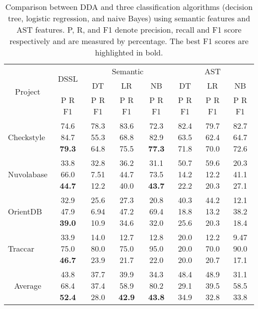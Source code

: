 \begin{table*}[t!]
	\centering
	\caption{Comparison between DDA and three classification algorithms (decision tree, logistic regression, and naive Bayes) using semantic features and AST features. P, R, and F1 denote precision, recall and F1 score respectively and are measured by percentage. The best F1 scores are highlighted in bold.}
	\begin{adjustbox}{width=1\textwidth}
	
	\begin{tabular}{|c|c|c|c|c|c|c|c|}
		\hline
		\multirow{3}[6]{*}{Project} & \multirow{2}[4]{*}{DSSL} & \multicolumn{3}{c|}{Semantic} & \multicolumn{3}{c|}{AST} \\
		\cline{3-8}          &       & DT    & LR    & NB    & DT    & LR    & NB \\
		\cline{2-8}          & P R F1 & P R F1 & P R F1 & P R F1 & P R F1 & P R F1 & P R F1 \\
		\hline
		\hline
		\multicolumn{1}{|l|}{Checkstyle} & 74.6 84.7 \textbf{79.3} & 78.3 55.3 64.8 & 83.6 68.8 75.5 & 72.3 82.9 \textbf{77.3} & 82.4 63.5 71.8 & 79.7 62.4 70.0  & 82.7 64.7 72.6 \\

		\multicolumn{1}{|l|}{Nuvolabase} & 33.8 66.0 \textbf{44.7} & 32.8 7.51 12.2 & 36.2 44.7 40.0 & 31.1 73.5 \textbf{43.7} & 50.7 14.2 22.2 & 59.6 12.2 20.3  & 20.3 41.1 27.1 \\
		
		\multicolumn{1}{|l|}{OrientDB} & 32.9 47.9 \textbf{39.0} & 25.6 6.94 10.9 & 27.3 47.2 34.6 & 20.8 69.4 32.0 & 40.3 18.8 25.6 & 44.2 13.2 20.3  & 12.1 38.2 18.4 \\
		
		\multicolumn{1}{|l|}{Traccar} & 33.9 75.0 \textbf{46.7} & 14.0 80.0 23.9 & 12.7 75.0 21.7 & 12.8 95.0 22.0 & 20.0 20.0 20.0 & 12.2 70.0 20.7  & 9.47 90.0 17.1 \\
		\hline
		\hline
		Average & 43.8 68.4 \textbf{52.4} & 37.7 37.4 28.0 & 39.9 58.9 \textbf{42.9} & 34.3 80.2 \textbf{43.8} & 48.4 29.1 34.9 & 48.9 39.5 32.8 & 31.1 58.5 33.8 \\
		\hline
	\end{tabular}%
	\end{adjustbox}
	\label{tab:within}%
\end{table*}%


